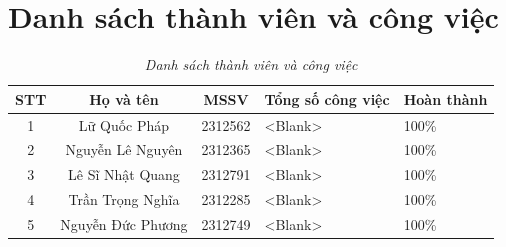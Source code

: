 \section*{Danh sách thành viên và công việc}
\begin{center}
\begin{table}[h]
\centering
\renewcommand{\arraystretch}{1.5}
\begin{tabular}{|c|c|c|p{4.5cm}|p{1.5cm}|}
\hline
\textbf{STT} & \textbf{Họ và tên} & \textbf{MSSV} & \textbf{Tổng số công việc} & \textbf{Hoàn thành}\\
\hline 
1 & Lữ Quốc Pháp & 2312562 & 
<Blank> & 100\% \\
\hline
2 & Nguyễn Lê Nguyên & 2312365 & 
<Blank> & 100\% \\
\hline
3 & Lê Sĩ Nhật Quang & 2312791 & 
<Blank> & 100\% \\
\hline
4 & Trần Trọng Nghĩa & 2312285 & 
<Blank> & 100\% \\
\hline
5 & Nguyễn Đức Phương & 2312749 & 
<Blank> & 100\% \\
\hline

\end{tabular}
\caption{\label{table1}\textit{Danh sách thành viên và công việc}}
\end{table}
\end{center}

